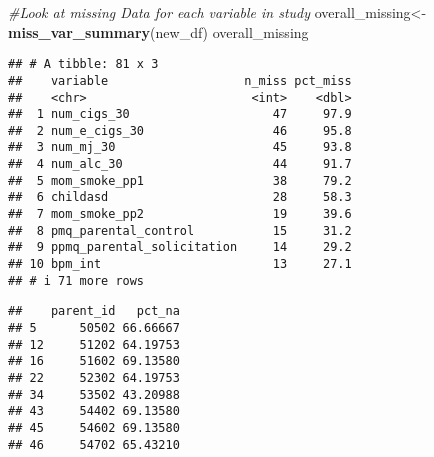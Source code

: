 \documentclass[
]{article}
\newenvironment{Shaded}{\begin{snugshade}}{\end{snugshade}}
\newcommand{\AttributeTok}[1]{\textcolor[rgb]{0.13,0.29,0.53}{#1}}
\newcommand{\CommentTok}[1]{\textcolor[rgb]{0.56,0.35,0.01}{\textit{#1}}}
\newcommand{\DecValTok}[1]{\textcolor[rgb]{0.00,0.00,0.81}{#1}}
\newcommand{\FunctionTok}[1]{\textcolor[rgb]{0.13,0.29,0.53}{\textbf{#1}}}
\newcommand{\NormalTok}[1]{#1}
\newcommand{\OtherTok}[1]{\textcolor[rgb]{0.56,0.35,0.01}{#1}}
\newcommand{\SpecialCharTok}[1]{\textcolor[rgb]{0.81,0.36,0.00}{\textbf{#1}}}
\begin{document}
\begin{Shaded}
\begin{Highlighting}[]
\CommentTok{\#Look at missing Data for each variable in study }
\NormalTok{overall\_missing}\OtherTok{\textless{}{-}}\FunctionTok{miss\_var\_summary}\NormalTok{(new\_df)}
\NormalTok{overall\_missing}
\end{Highlighting}
\end{Shaded}

\begin{verbatim}
## # A tibble: 81 x 3
##    variable                   n_miss pct_miss
##    <chr>                       <int>    <dbl>
##  1 num_cigs_30                    47     97.9
##  2 num_e_cigs_30                  46     95.8
##  3 num_mj_30                      45     93.8
##  4 num_alc_30                     44     91.7
##  5 mom_smoke_pp1                  38     79.2
##  6 childasd                       28     58.3
##  7 mom_smoke_pp2                  19     39.6
##  8 pmq_parental_control           15     31.2
##  9 ppmq_parental_solicitation     14     29.2
## 10 bpm_int                        13     27.1
## # i 71 more rows
\end{verbatim}

\begin{Shaded}
\end{Shaded}

\begin{verbatim}
##    parent_id   pct_na
## 5      50502 66.66667
## 12     51202 64.19753
## 16     51602 69.13580
## 22     52302 64.19753
## 34     53502 43.20988
## 43     54402 69.13580
## 45     54602 69.13580
## 46     54702 65.43210
\end{verbatim}
\end{document}
